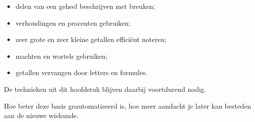 \documentclass{ximera}
\begin{document}
\begin{itemize}
    \item delen van een geheel beschrijven met breuken;
    \item verhoudingen en procenten gebruiken;
    \item zeer grote en zeer kleine getallen efficiënt noteren;
    \item machten en wortels gebruiken;
    \item getallen vervangen door letters en formules.
\end{itemize}

De technieken uit dit hoofdstuk blijven daarbij voortdurend nodig.

Hoe beter deze basis geautomatiseerd is, hoe meer aandacht je later kan
besteden aan de nieuwe wiskunde.
\end{document}
